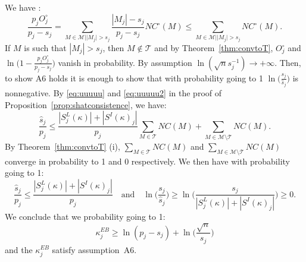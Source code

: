 \documentclass[aos]{imsart}
\theoremstyle{plain}
\newcommand{\M}{\mathcal{M}}
\newcommand{\T}{\mathcal{T}}
\begin{document}
We have :
$$\frac{p_j O^{\circ}_j}{p_j-s_j} =  \sum_{M \in \M | |M_j| > s_j}\frac{|M_j|-s_j}{p_j-s_j}NC^{\circ}(M)\leq \sum_{M \in \M | |M_j| > s_j}NC^{\circ}(M).$$ 
If $M$ is such that $|M_j|>s_j$, then $M\not\in\T$ and by Theorem~\ref{thm:convtoT}, $O^{\circ}_j$ and $\ln\Big(1-\frac{p_j O^{\circ}_j}{p_j-s_j}\Big)$ vanish in probability. By assumption $\ln(\sqrt{n}s_j^{-1})\to+\infty$. Then, to show A6 holds it is enough to show that with probability going to 1 $\ln\Big(\frac{s_j}{\widehat{s}_j}\Big)$ is nonnegative. By \eqref{eq:uuuuu} and \eqref{eq:uuuuu2} in the proof of Proposition~\ref{prop:shatconsistence}, we have:
\begin{equation*}
    \frac{\widehat{s}_j}{p_j}\leq \frac{|S^{L}_j(\kappa)|+|S^{I}(\kappa)_j|}{p_j}\sum_{M \in \T}NC(M) + \sum_{M \in \M\setminus \T}NC(M).
\end{equation*}
By Theorem~\ref{thm:convtoT} (i), $\sum_{M \in \T}NC(M)$ and $\sum_{M \in \M\setminus\T}NC(M)$ converge in probability to 1 and 0 respectively. We then have with probability going to 1:
\begin{equation*}
    \frac{\widehat{s}_j}{p_j}\leq \frac{|S^{L}_j(\kappa)|+|S^{I}(\kappa)_j|}{p_j} \quad\text{and}\quad\ln\Big(\frac{s_j}{\widehat{s}_j}\Big)\geq \ln\bigg(\frac{s_j}{|S^{L}_j(\kappa)|+|S^{I}(\kappa)_j|} \bigg) \geq 0.
\end{equation*}
We conclude that we probability going to 1:
\begin{equation}\label{eq:eeeeeeeh}
    \kappa^{EB}_j
    \geq  \ln(p_j-s_j)+\ln\Big(\frac{\sqrt{n}}{s_j}\Big)
\end{equation}
and the $\kappa^{EB}_j$ satisfy assumption~A6.\medskip
\end{document}
